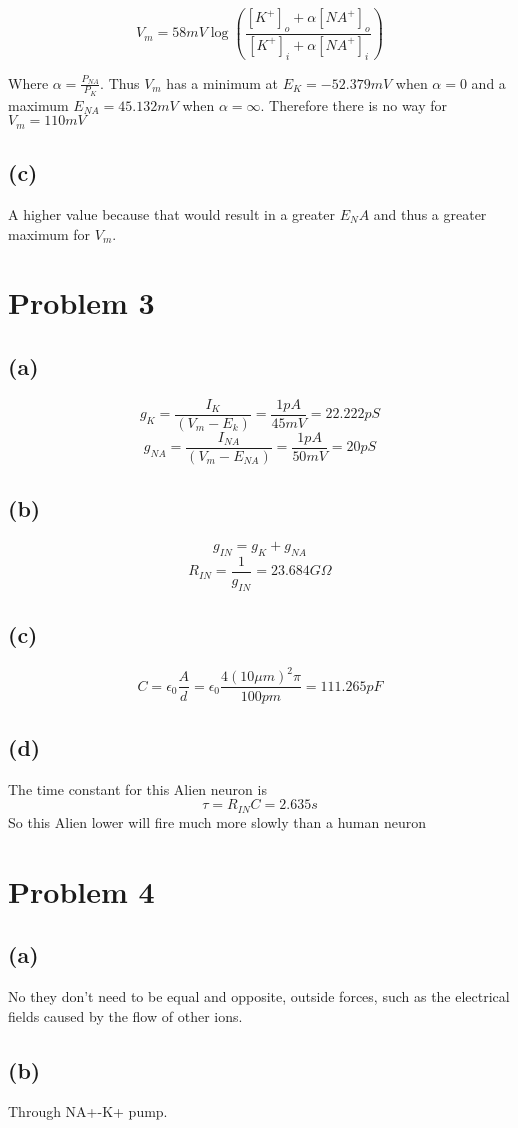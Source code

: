 \documentclass[12pt]{article}
\begin{document}
$$V_m=58mV\log\left(\frac{[K^+]_o +\alpha[NA^+]_o}{[K^+]_i +\alpha[NA^+]_i}\right)$$

Where $\alpha=\frac{P_{NA}}{P_K}$. Thus $V_m$ has a minimum at $E_K=-52.379mV$ when $\alpha=0$ and a maximum $E_{NA}=45.132mV$ when $\alpha=\infty$. Therefore there is no way for $V_m=110mV$
\subsection*{(c)}
A higher value because that would result in a greater $E_NA$ and thus a greater maximum for $V_m$.
\section*{Problem 3}
\subsection*{(a)}
$$g_K=\frac{I_K}{(V_m-E_k)}=\frac{1pA}{45mV}=22.222pS$$
$$g_{NA}=\frac{I_{NA}}{(V_m-E_{NA})}=\frac{1pA}{50mV}=20 pS$$
\subsection*{(b)}
$$g_{IN}=g_K+g_{NA}$$
$$R_{IN}=\frac{1}{g_{IN}}=23.684 G\Omega$$
\subsection*{(c)}
$$C=\epsilon_0\frac{A}{d}=\epsilon_0\frac{4(10\mu m)^2 \pi}{100pm}=111.265pF$$
\subsection*{(d)}
The time constant for this Alien neuron is
$$\tau=R_{IN}C=2.635s$$
So this Alien lower will fire much more slowly than a human neuron
\section*{Problem 4}
\subsection*{(a)}
No they don't need to be equal and opposite, outside forces, such as the electrical fields caused by the flow of other ions.
\subsection*{(b)}
Through NA+-K+ pump.
\end{document}
